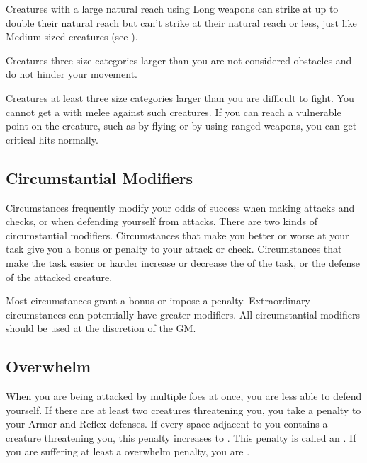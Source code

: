             Creatures with a large natural reach using Long weapons can strike at up to double their natural reach but can't strike at their natural reach or less, just like Medium sized creatures (see ).

             Creatures three size categories larger than you are not considered obstacles and do not hinder your movement.

             Creatures at least three size categories larger than you are difficult to fight. You cannot get a  with melee  against such creatures. If you can reach a vulnerable point on the creature, such as by flying or by using ranged weapons, you can get critical hits normally.

    \subsection{Circumstantial Modifiers}

        Circumstances frequently modify your odds of success when making attacks and checks, or when defending yourself from attacks.
        There are two kinds of circumstantial modifiers.
        Circumstances that make you better or worse at your task give you a bonus or penalty to your attack or check.
        Circumstances that make the task easier or harder increase or decrease the  of the task, or the defense of the attacked creature.

        Most circumstances grant a  bonus or impose a  penalty.
        Extraordinary circumstances can potentially have greater modifiers.
        All circumstantial modifiers should be used at the discretion of the GM.\@

    \subsection{Overwhelm}\label{Overwhelm}
        When you are being attacked by multiple foes at once, you are less able to defend yourself.
        If there are at least two creatures threatening you, you take a  penalty to your Armor and Reflex defenses.
        If every space adjacent to you contains a creature threatening you, this penalty increases to .
        This penalty is called an .
        If you are suffering at least a  overwhelm penalty, you are .

